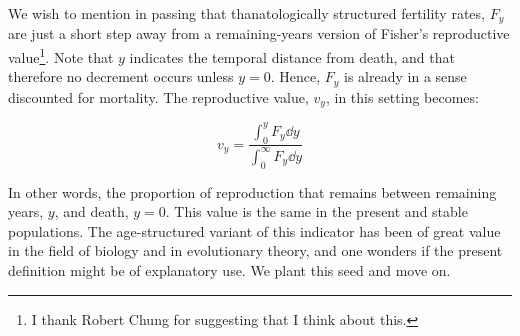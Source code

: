 
We wish to mention in passing that thanatologically structured fertility rates,
$F_y$ are just a short step away from a remaining-years version of Fisher's
\citep{fisher1999genetical} reproductive value\footnote{I thank Robert Chung
for suggesting that I think about this.}. Note that $y$ indicates the
temporal distance from death, and that therefore no decrement occurs unless $y=0$. Hence, $F_y$ is already in a sense discounted for mortality. The
reproductive value, $v_y$, in this setting becomes:

\begin{equation}
\label{eq:eyfisher}
v_y = \frac{\int _0 ^y F_y \dd y}{\int _0 ^\infty F_y \dd y} 
\end{equation}

In other words, the proportion of reproduction that remains between
remaining years, $y$, and death, $y=0$. This value is the same in the present
and stable populations. The age-structured variant of this indicator has been of
great value in the field of biology and in evolutionary theory, and one wonders
if the present definition might be of explanatory use. We plant this seed and
move on.
